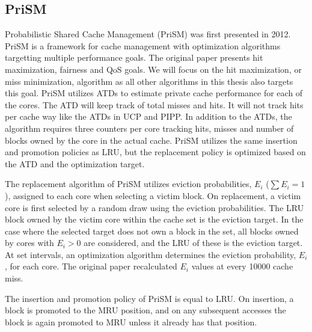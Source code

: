 \subsection{PriSM}
\label{sec:algorithms:prism}

Probabilistic Shared Cache Management (PriSM) was first presented in 2012.
PriSM is a framework for cache management with optimization algorithms targetting multiple performance goals.
The original paper presents hit maximization, fairness and QoS goals.
We will focus on the hit maximization, or miss minimization, algorithm as all other algorithms in this thesis also targets this goal.
PriSM utilizes ATDs to estimate private cache performance for each of the cores.
The ATD will keep track of total misses and hits.
It will not track hits per cache way like the ATDs in UCP and PIPP.
In addition to the ATDs, the algorithm requires three counters per core tracking hits, misses and number of blocks owned by the core in the actual cache.
PriSM utilizes the same insertion and promotion policies as LRU, but the replacement policy is optimized based on the ATD and the optimization target.

The replacement algorithm of PriSM utilizes eviction probabilities, $E_i$ ($\sum{E_i} = 1$), assigned to each core when selecting a victim block.
On replacement, a victim core is first selected by a random draw using the eviction probabilities.
The LRU block owned by the victim core within the cache set is the eviction target.
In the case where the selected target does not own a block in the set, all blocks owned by cores with $E_i > 0$ are considered, and the LRU of these is the eviction target.
At set intervals, an optimization algorithm determines the eviction probability, $E_i$, for each core.
The original paper recalculated $E_i$ values at every 10000 cache miss.

The insertion and promotion policy of PriSM is equal to LRU.
On insertion, a block is promoted to the MRU position, and on any subsequent accesses the block is again promoted to MRU unless it already has that position.

